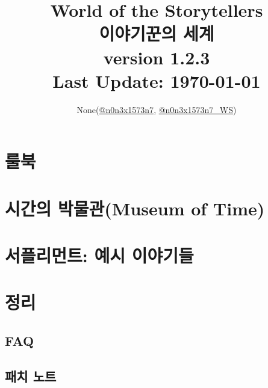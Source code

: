 \documentclass[12pt]{report}
\title{
	World of the Storytellers\\
	이야기꾼의 세계\\
	\large version 1.2.3\\
	Last Update: \today \\
}
\author{None(\href{https://www.twitter.com/n0n3x1573n7}{@n0n3x1573n7}, \href{https://www.twitter.com/n0n3x1573n7_WS}{@n0n3x1573n7\_WS})}
\date{}
\begin{document}
	\maketitle

	\vspace*{\fill}
	{\doclicenseThis}
	
	\setcounter{tocdepth}{-1}
	
\iffalse
	\chapter*{서론}
		
\fi
	
	\tableofcontents
	
	\part{룰북}
		
	
	\part{시간의 박물관(Museum of Time)}
		
	
	\part{서플리먼트: 예시 이야기들} \label{endof_MoT}
		
	
	\part{정리}
		\chapter*{FAQ}
			
		
		\chapter*{패치 노트}
			
		
			\printindex
	
	\vspace*{\fill}
	{\doclicenseThis}
	
\end{document}
